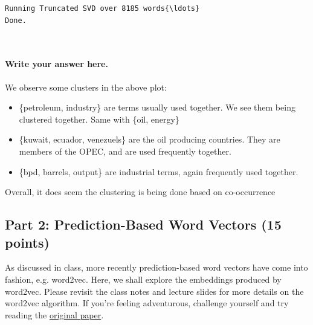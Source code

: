 \documentclass[11pt]{article}
\providecommand{\tightlist}{%
      \setlength{\itemsep}{0pt}\setlength{\parskip}{0pt}}
\begin{document}
    \begin{Verbatim}[commandchars=\\\{\}]
Running Truncated SVD over 8185 words{\ldots}
Done.

    \end{Verbatim}

    \begin{center}
    \end{center}
    { \hspace*{\fill} \\}
    
    \paragraph{Write your answer here.}\label{write-your-answer-here.}

We observe some clusters in the above plot:

\begin{itemize}
\tightlist
\item
  \{petroleum, industry\} are terms usually used together. We see them
  being clustered together. Same with \{oil, energy\}
\item
  \{kuwait, ecuador, venezuels\} are the oil producing countries. They
  are members of the OPEC, and are used frequently together.
\item
  \{bpd, barrels, output\} are industrial terms, again frequently used
  together.
\end{itemize}

Overall, it does seem the clustering is being done based on
co-occurrence

    \subsection{Part 2: Prediction-Based Word Vectors (15
points)}\label{part-2-prediction-based-word-vectors-15-points}

As discussed in class, more recently prediction-based word vectors have
come into fashion, e.g. word2vec. Here, we shall explore the embeddings
produced by word2vec. Please revisit the class notes and lecture slides
for more details on the word2vec algorithm. If you're feeling
adventurous, challenge yourself and try reading the
\href{https://papers.nips.cc/paper/5021-distributed-representations-of-words-and-phrases-and-their-compositionality.pdf}{original
paper}.
\end{document}

